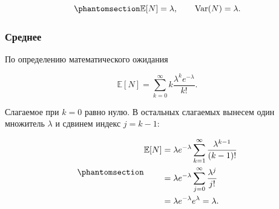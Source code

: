 \documentclass[
  russian,
  11pt,
  a4paper,
  open=any]{scrbook}
\begin{document}
\begin{equation}\protect\phantomsection\label{eq-poisson-moments}{
\mathbb E[N]=\lambda,
\qquad
\operatorname{Var}(N)=\lambda.
}\end{equation}

\begin{bookderivation}

\subsubsection{Среднее}\label{ux441ux440ux435ux434ux43dux435ux435-1}

По определению математического ожидания

\[
\mathbb E[N]
=\sum_{k=0}^{\infty}k\frac{\lambda^k e^{-\lambda}}{k!}.
\]

Слагаемое при \(k=0\) равно нулю. В остальных слагаемых вынесем один
множитель \(\lambda\) и сдвинем индекс \(j=k-1\):

\begin{equation}\protect\phantomsection\label{eq-poisson-mean}{
\begin{aligned}
\mathbb E[N]
&=\lambda e^{-\lambda}
\sum_{k=1}^{\infty}\frac{\lambda^{k-1}}{(k-1)!}\\
&=\lambda e^{-\lambda}
\sum_{j=0}^{\infty}\frac{\lambda^j}{j!}\\
&=\lambda e^{-\lambda}e^\lambda
=\lambda.
\end{aligned}
}\end{equation}

\end{bookderivation}
\end{document}
